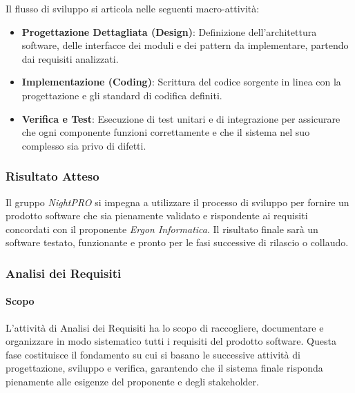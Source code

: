 \documentclass[a4paper, 11pt, oneside]{scrartcl} %
\begin{document}
Il flusso di sviluppo si articola nelle seguenti macro-attività:
\begin{itemize}
    \item \textbf{Progettazione Dettagliata (Design)}: Definizione dell'architettura{\scriptsize{}} software, delle interfacce dei moduli e dei pattern da implementare, partendo dai requisiti analizzati.
    \item \textbf{Implementazione (Coding)}: Scrittura del codice sorgente in linea con la progettazione e gli standard di codifica definiti.
    \item \textbf{Verifica e Test}: Esecuzione di test unitari e di integrazione per assicurare che ogni componente funzioni correttamente e che il sistema nel suo complesso sia privo di difetti.
\end{itemize}

\subsubsection{Risultato Atteso}
Il gruppo \textit{NightPRO} si impegna a utilizzare il processo di sviluppo per fornire un prodotto software che sia pienamente validato e rispondente ai requisiti concordati con il proponente \textit{Ergon Informatica}. Il risultato finale sarà un software testato, funzionante e pronto per le fasi successive di rilascio o collaudo.

\subsubsection{Analisi dei Requisiti{\scriptsize{}}}

\paragraph{Scopo}
L'attività di Analisi dei Requisiti ha lo scopo di raccogliere, documentare e organizzare in modo sistematico tutti i requisiti{\scriptsize{}} del prodotto software.
Questa fase costituisce il fondamento su cui si basano le successive attività di progettazione, sviluppo e verifica, garantendo che il sistema finale risponda pienamente alle esigenze del proponente e degli stakeholder{\scriptsize{}}.
\end{document}
